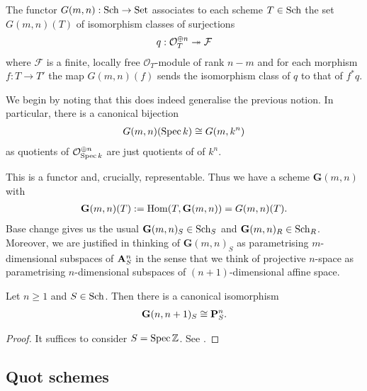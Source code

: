 \documentclass{article}
\begin{document}
\begin{definition}
  The functor $G(m,n) : \operatorname{Sch} \to \operatorname{Set}$ associates to
  each scheme $T\in\operatorname{Sch}$ the set $G(m,n)(T)$ of isomorphism
  classes of surjections
  \begin{align*}
    q : \mathcal O^{\oplus n}_T \twoheadrightarrow \mathcal F
  \end{align*}
  where $\mathcal F$ is a finite, locally free $\mathcal O_T$-module
  of rank $n-m$ and for each morphism $f:T\to T'$ the map
  $G(m,n)(f)$ sends the isomorphism class of $q$ to that
  of $f^*q$.
\end{definition}

We begin by noting that this does indeed generalise the previous
notion. In particular, there is a canonical bijection
\begin{align*}
  G(m,n)(\operatorname{Spec} k) \cong G(m,k^n)
\end{align*}
as quotients of $\mathcal O^{\oplus n}_{\operatorname{Spec} k}$ are just quotients
of of $k^n$. 

This is a functor and, crucially, representable. Thus we
have a scheme $\mathbf G(m,n)$ with
\begin{align*}
  \mathbf G(m,n)(T) := \operatorname{Hom}(T,\mathbf G(m,n)) = G(m,n)(T).
\end{align*}
Base change gives us the usual $\mathbf G(m,n)_S\in\operatorname{Sch}_S$ and
$\mathbf G(m,n)_R\in\operatorname{Sch}_R$.
Moreover, we are justified in thinking of $\mathbf G(m,n)_S$ as
parametrising $m$-dimensional subspaces of $\mathbf{A}^{n}_{S}$ in the
sense that we think of projective $n$-space as parametrising
$n$-dimensional subspaces of $(n+1)$-dimensional affine space.

\begin{proposition}
  Let $n\geq 1$ and $S\in\operatorname{Sch}$. Then there is a canonical isomorphism
  \begin{align*}
    \mathbf G(n,n+1)_S \cong \mathbf{P}^{n}_{S}.
  \end{align*}
  \begin{proof}
    It suffices to consider $S=\operatorname{Spec}\mathbb{Z}$.
    See \cite[\href{https://stacks.math.columbia.edu/tag/089V}{Tag 089V}]{stacks-project}.
  \end{proof}
\end{proposition}

\subsection{Quot schemes}
\end{document}

